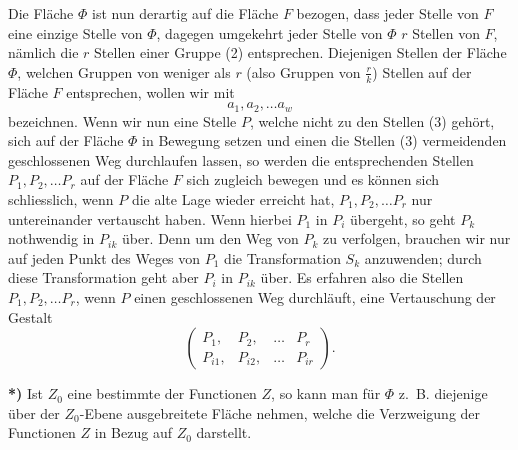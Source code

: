 \documentclass{article}
\begin{document}
Die Fläche $\Phi$ ist nun derartig auf die Fläche $F$ bezogen, dass jeder Stelle von $F$ eine einzige Stelle von $\Phi$, dagegen umgekehrt jeder Stelle von $\Phi$ $r$ Stellen von $F$, nämlich die $r$ Stellen einer Gruppe (2) entsprechen. Diejenigen Stellen der Fläche $\Phi$, welchen Gruppen von weniger als $r$ (also Gruppen von $\frac{r}{k}$) Stellen auf der Fläche $F$ entsprechen, wollen wir mit
\[
a_1, a_2, \dots a_w
\tag{3}
\]
bezeichnen. Wenn wir nun eine Stelle $P$, welche nicht zu den Stellen (3) gehört, sich auf der Fläche $\Phi$ in Bewegung setzen und einen die Stellen (3) vermeidenden geschlossenen Weg durchlaufen lassen, so werden die entsprechenden Stellen $P_1, P_2, \dots P_r$ auf der Fläche $F$ sich zugleich bewegen und es können sich schliesslich, wenn $P$ die alte Lage wieder erreicht hat, $P_1, P_2, \dots P_r$ nur untereinander vertauscht haben. Wenn hierbei $P_1$ in $P_i$ übergeht, so geht $P_k$ nothwendig in $P_{ik}$ über. Denn um den Weg von $P_k$ zu verfolgen, brauchen wir nur auf jeden Punkt des Weges von $P_1$ die Transformation $S_k$ anzuwenden; durch diese Transformation geht aber $P_i$ in $P_{ik}$ über. Es erfahren also die Stellen $P_1, P_2, \dots P_r$, wenn $P$ einen geschlossenen Weg durchläuft, eine Vertauschung der Gestalt
\[
\begin{pmatrix}
P_1, & P_2, & \dots & P_r \\
P_{i1}, & P_{i2}, & \dots & P_{ir}
\end{pmatrix}.
\tag{4}
\]

\textbf{*)} Ist $Z_0$ eine bestimmte der Functionen $Z$, so kann man für $\Phi$ z.~B. diejenige über der $Z_0$-Ebene ausgebreitete Fläche nehmen, welche die Verzweigung der Functionen $Z$ in Bezug auf $Z_0$ darstellt.
\end{document}
